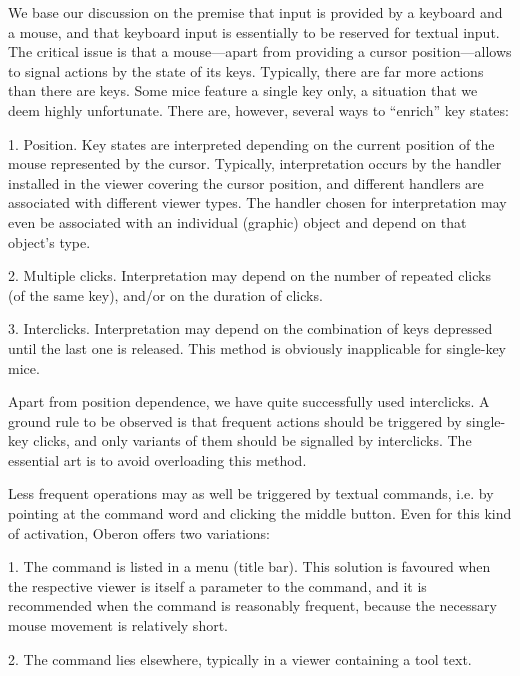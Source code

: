 We base our discussion on the premise that input is provided by a keyboard and a mouse, and that keyboard input is essentially to be reserved for textual input. The critical issue is that a mouse---apart from providing a cursor position---allows to signal actions by the state of its keys. Typically, there are far more actions than there are keys. Some mice feature a single key only, a situation that we deem highly unfortunate. There are, however, several ways to ``enrich'' key states:

\item{1.} Position. Key states are interpreted depending on the current position of the mouse represented by the cursor. Typically, interpretation occurs by the handler installed in the viewer covering the cursor position, and different handlers are associated with different viewer types. The handler chosen for interpretation may even be associated with an individual (graphic) object and depend on that object's type.
\item{2.} Multiple clicks. Interpretation may depend on the number of repeated clicks (of the same key), and/or on the duration of clicks.
\item{3.} Interclicks. Interpretation may depend on the combination of keys depressed until the last one is released. This method is obviously inapplicable for single-key mice.

Apart from position dependence, we have quite successfully used interclicks. A ground rule to be observed is that frequent actions should be triggered by single-key clicks, and only variants of them should be signalled by interclicks. The essential art is to avoid overloading this method.

Less frequent operations may as well be triggered by textual commands, i.e. by pointing at the command word and clicking the middle button. Even for this kind of activation, Oberon offers two variations:

\item{1.} The command is listed in a menu (title bar). This solution is favoured when the respective viewer is itself a parameter to the command, and it is recommended when the command is reasonably frequent, because the necessary mouse movement is relatively short.
\item{2.} The command lies elsewhere, typically in a viewer containing a tool text.


